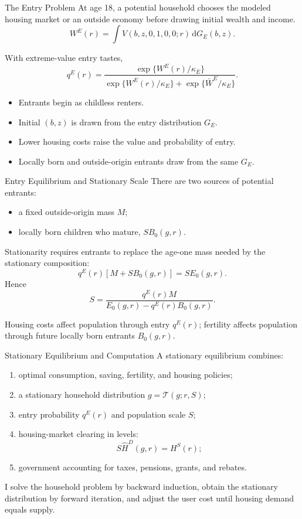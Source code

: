 \documentclass[aspectratio=169,11pt]{beamer}
\newcommand{\tightitems}{\setlength{\itemsep}{0.55em}}
\newcommand{\1}{\mathbf 1}
\begin{document}
\begin{frame}{The Entry Problem}
  At age 18, a potential household chooses the modeled housing market or an outside economy before drawing initial wealth and income.
  \[
    W^E(r)=\int V(b,z,0,1,0,0;r)\,\mathrm dG_E(b,z).
  \]

  With extreme-value entry tastes,
  \[
    q^E(r)
    =\frac{\exp\{W^E(r)/\kappa_E\}}
    {\exp\{W^E(r)/\kappa_E\}+\exp\{\bar W^E/\kappa_E\}}.
  \]

  \begin{itemize}\tightitems
    \item Entrants begin as childless renters.
    \item Initial $(b,z)$ is drawn from the entry distribution $G_E$.
    \item Lower housing costs raise the value and probability of entry.
    \item Locally born and outside-origin entrants draw from the same $G_E$.
  \end{itemize}
\end{frame}

\begin{frame}{Entry Equilibrium and Stationary Scale}
  There are two sources of potential entrants:
  \begin{itemize}\tightitems
    \item a fixed outside-origin mass $M$;
    \item locally born children who mature, $SB_0(g,r)$.
  \end{itemize}

  Stationarity requires entrants to replace the age-one mass needed by the stationary composition:
  \[
    q^E(r)\left[M+SB_0(g,r)\right]=SE_0(g,r).
  \]
  Hence
  \[
    S=\frac{q^E(r)M}{E_0(g,r)-q^E(r)B_0(g,r)}.
  \]

  Housing costs affect population through entry $q^E(r)$; fertility affects population through future locally born entrants $B_0(g,r)$.
\end{frame}

\begin{frame}{Stationary Equilibrium and Computation}
  A stationary equilibrium combines:
  \begin{enumerate}\tightitems
    \item optimal consumption, saving, fertility, and housing policies;
    \item a stationary household distribution $g=\mathcal T(g;r,S)$;
    \item entry probability $q^E(r)$ and population scale $S$;
    \item housing-market clearing in levels:
    \[
      S\widehat H^D(g,r)=H^S(r);
    \]
    \item government accounting for taxes, pensions, grants, and rebates.
  \end{enumerate}

  I solve the household problem by backward induction, obtain the stationary distribution by forward iteration, and adjust the user cost until housing demand equals supply.
\end{frame}
\end{document}
